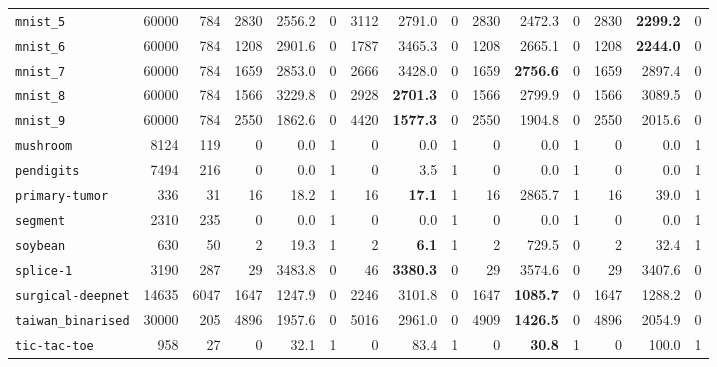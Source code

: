 \begin{tabular}{lccrrrrrrrrrrrr}
\texttt{mnist\_5} & \multicolumn{1}{r}{60000} & \multicolumn{1}{r}{784}  & 2830 & 2556.2 & 0 & 3112 & 2791.0 & 0 & 2830 & 2472.3 & 0 & 2830 & \textbf{2299.2} & 0\\
\texttt{mnist\_6} & \multicolumn{1}{r}{60000} & \multicolumn{1}{r}{784}  & 1208 & 2901.6 & 0 & 1787 & 3465.3 & 0 & 1208 & 2665.1 & 0 & 1208 & \textbf{2244.0} & 0\\
\texttt{mnist\_7} & \multicolumn{1}{r}{60000} & \multicolumn{1}{r}{784}  & 1659 & 2853.0 & 0 & 2666 & 3428.0 & 0 & 1659 & \textbf{2756.6} & 0 & 1659 & 2897.4 & 0\\
\texttt{mnist\_8} & \multicolumn{1}{r}{60000} & \multicolumn{1}{r}{784}  & 1566 & 3229.8 & 0 & 2928 & \textbf{2701.3} & 0 & 1566 & 2799.9 & 0 & 1566 & 3089.5 & 0\\
\texttt{mnist\_9} & \multicolumn{1}{r}{60000} & \multicolumn{1}{r}{784}  & 2550 & 1862.6 & 0 & 4420 & \textbf{1577.3} & 0 & 2550 & 1904.8 & 0 & 2550 & 2015.6 & 0\\
\texttt{mushroom} & \multicolumn{1}{r}{8124} & \multicolumn{1}{r}{119}  & 0 & 0.0 & 1 & 0 & 0.0 & 1 & 0 & 0.0 & 1 & 0 & 0.0 & 1\\
\texttt{pendigits} & \multicolumn{1}{r}{7494} & \multicolumn{1}{r}{216}  & 0 & 0.0 & 1 & 0 & 3.5 & 1 & 0 & 0.0 & 1 & 0 & 0.0 & 1\\
\texttt{primary-tumor} & \multicolumn{1}{r}{336} & \multicolumn{1}{r}{31}  & 16 & 18.2 & 1 & 16 & \textbf{17.1} & 1 & 16 & 2865.7 & 1 & 16 & 39.0 & 1\\
\texttt{segment} & \multicolumn{1}{r}{2310} & \multicolumn{1}{r}{235}  & 0 & 0.0 & 1 & 0 & 0.0 & 1 & 0 & 0.0 & 1 & 0 & 0.0 & 1\\
\texttt{soybean} & \multicolumn{1}{r}{630} & \multicolumn{1}{r}{50}  & 2 & 19.3 & 1 & 2 & \textbf{6.1} & 1 & 2 & 729.5 & 0 & 2 & 32.4 & 1\\
\texttt{splice-1} & \multicolumn{1}{r}{3190} & \multicolumn{1}{r}{287}  & 29 & 3483.8 & 0 & 46 & \textbf{3380.3} & 0 & 29 & 3574.6 & 0 & 29 & 3407.6 & 0\\
\texttt{surgical-deepnet} & \multicolumn{1}{r}{14635} & \multicolumn{1}{r}{6047}  & 1647 & 1247.9 & 0 & 2246 & 3101.8 & 0 & 1647 & \textbf{1085.7} & 0 & 1647 & 1288.2 & 0\\
\texttt{taiwan\_binarised} & \multicolumn{1}{r}{30000} & \multicolumn{1}{r}{205}  & 4896 & 1957.6 & 0 & 5016 & 2961.0 & 0 & 4909 & \textbf{1426.5} & 0 & 4896 & 2054.9 & 0\\
\texttt{tic-tac-toe} & \multicolumn{1}{r}{958} & \multicolumn{1}{r}{27}  & 0 & 32.1 & 1 & 0 & 83.4 & 1 & 0 & \textbf{30.8} & 1 & 0 & 100.0 & 1\\

\end{tabular}
